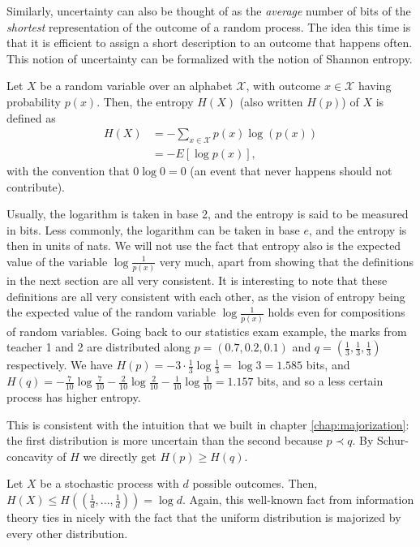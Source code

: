 Similarly, uncertainty can also be thought of as the \textit{average} number of bits of the \textit{shortest} representation of the outcome of a random process. The idea this time is that it is efficient to assign a short description to an outcome that happens often. This notion of uncertainty can be formalized with the notion of Shannon entropy.

\begin{definition}
    Let $X$ be a random variable over an alphabet $\mathcal{X}$, with outcome $x \in \mathcal{X}$ having probability $p(x)$. Then, the entropy $H(X)$ (also written $H(p)$) of $X$ is defined as
    \begin{align}
        H(X) &= - \sum_{x \in \mathcal{X}} p(x) \log(p(x)) \\
             &= - E[\log p(x)],
    \end{align}
    with the convention that $0 \log 0 = 0$ (an event that never happens should not contribute).
\end{definition}

Usually, the logarithm is taken in base 2, and the entropy is said to be measured in bits. Less commonly, the logarithm can be taken in base $e$, and the entropy is then in units of nats. We will not use the fact that entropy also is the expected value of the variable $\log \frac{1}{p(x)}$ very much, apart from showing that the definitions in the next section are all very consistent. It is interesting to note that these definitions are all very consistent with each other, as the vision of entropy being the expected value of the random variable $\log \frac{1}{p(x)}$ holds even for compositions of random variables. Going back to our statistics exam example, the marks from teacher 1 and 2 are distributed along $p = (0.7, 0.2, 0.1)$ and $q = \left(\frac{1}{3}, \frac{1}{3}, \frac{1}{3}\right)$ respectively. We have $H(p) = - 3 \cdot \frac{1}{3} \log \frac{1}{3} = \log 3 = 1.585$ bits, and $H(q) = - \frac{7}{10} \log \frac{7}{10} - \frac{2}{10} \log \frac{2}{10} - \frac{1}{10} \log \frac{1}{10} = 1.157$ bits, and so a less certain process has higher entropy.

\begin{remark}
    This is consistent with the intuition that we built in chapter \ref{chap:majorization}: the first distribution is more uncertain than the second because $p \prec q$. By Schur-concavity of $H$ we directly get $H(p) \geq H(q)$.
\end{remark}

\begin{remark}
    Let $X$ be a stochastic process with $d$ possible outcomes. Then, $H(X) \leq H\left(\left(\frac{1}{d}, ..., \frac{1}{d}\right)\right) = \log d$. Again, this well-known fact from information theory ties in nicely with the fact that the uniform distribution is majorized by every other distribution.
\end{remark}

